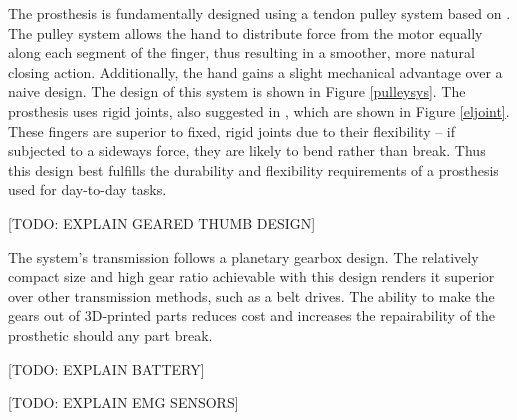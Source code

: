 \documentclass[11pt,3p]{report}
\begin{document}
\begin{multicols}{2}
The prosthesis is fundamentally designed using a tendon pulley system based on \cite{mottardunderactuated}. The pulley system allows the hand to distribute force from the motor equally along each segment of the finger, thus resulting in a smoother, more natural closing action. Additionally, the hand gains a slight mechanical advantage over a naive design. The design of this system is shown in Figure \ref{pulleysys}. The prosthesis uses rigid joints, also suggested in \cite{mottardunderactuated}, which are shown in Figure \ref{eljoint}. These fingers are superior to fixed, rigid joints due to their flexibility -- if subjected to a sideways force, they are likely to bend rather than break. Thus this design best fulfills the durability and flexibility requirements of a prosthesis used for day-to-day tasks. 

[TODO: EXPLAIN GEARED THUMB DESIGN]

The system's transmission follows a planetary gearbox design. The relatively compact size and high gear ratio achievable with this design renders it superior over other transmission methods, such as a belt drives. The ability to make the gears out of 3D-printed parts reduces cost and increases the repairability of the prosthetic should any part break.

[TODO: EXPLAIN BATTERY]

[TODO: EXPLAIN EMG SENSORS]
\end{multicols}
\end{document}

